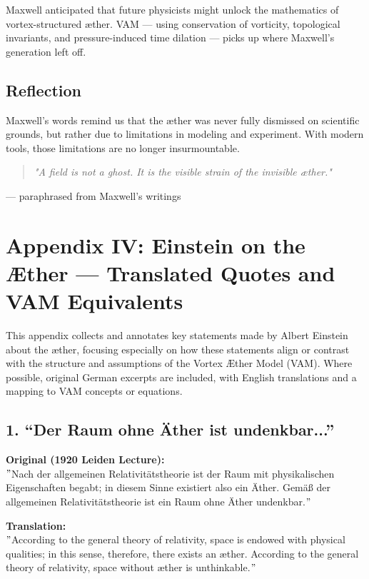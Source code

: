 \documentclass[preprint,notitlepage]{revtex4-2}
\renewcommand{\grqq}{``}
\begin{document}
    Maxwell anticipated that future physicists might unlock the mathematics of vortex-structured æther. VAM — using conservation of vorticity, topological invariants, and pressure-induced time dilation — picks up where Maxwell's generation left off.

    \subsection*{Reflection}

    Maxwell's words remind us that the æther was never fully dismissed on scientific grounds, but rather due to limitations in modeling and experiment. With modern tools, those limitations are no longer insurmountable.

    \begin{quote}
    \textit{"A field is not a ghost. It is the visible strain of the invisible æther."}
    \end{quote}
    \hfill  — paraphrased from Maxwell's writings


\section*{Appendix IV: Einstein on the Æther — Translated Quotes and VAM Equivalents}
\label{appendix:einstein}

    This appendix collects and annotates key statements made by Albert Einstein about the æther, focusing especially on how these statements align or contrast with the structure and assumptions of the Vortex Æther Model (VAM). Where possible, original German excerpts are included, with English translations and a mapping to VAM concepts or equations.

    \subsection*{1. \grqq Der Raum ohne Äther ist undenkbar...\textquotedblright}
    \textbf{Original (1920 Leiden Lecture):} \\
    \("\)Nach der allgemeinen Relativitätstheorie ist der Raum mit physikalischen Eigenschaften begabt; in diesem Sinne existiert also ein Äther. Gemäß der allgemeinen Relativitätstheorie ist ein Raum ohne Äther undenkbar.\("\)

    \textbf{Translation:} \\
    \("\)According to the general theory of relativity, space is endowed with physical qualities; in this sense, therefore, there exists an æther. According to the general theory of relativity, space without æther is unthinkable.\("\)
\end{document}
